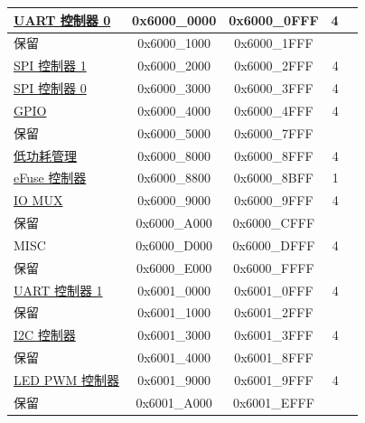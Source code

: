 \begin{longtable}[c]{ |p{5cm}|c|c|r|p{1.0cm}| }
		                \hyperref[mod:uart]{UART 控制器 0}           & 0x6000\_0000 & 0x6000\_0FFF &   4    &   \\\hline
    \rowcolor{gray!25}  保留                    & 0x6000\_1000 & 0x6000\_1FFF &        &   \\\hline
                        \hyperref[mod:spi]{SPI 控制器 1}            & 0x6000\_2000 & 0x6000\_2FFF &   4    &   \\\hline
                        \hyperref[mod:spi]{SPI 控制器 0}            & 0x6000\_3000 & 0x6000\_3FFF &   4    &   \\\hline
                        \hyperref[mod:iomuxgpio]{GPIO}                    & 0x6000\_4000 & 0x6000\_4FFF &   4    &   \\\hline
    \rowcolor{gray!25}  保留                    & 0x6000\_5000 & 0x6000\_7FFF &        &   \\\hline
                        \hyperref[mod:lowpowm]{低功耗管理}              & 0x6000\_8000 & 0x6000\_8FFF &   4    &   \\\hline
                        \hyperref[mod:efuse]{eFuse 控制器}            & 0x6000\_8800 & 0x6000\_8BFF &   1    &   \\\hline
                        \hyperref[mod:iomuxgpio]{IO MUX}                  & 0x6000\_9000 & 0x6000\_9FFF &   4    &   \\\hline
    \rowcolor{gray!25}  保留                    & 0x6000\_A000 & 0x6000\_CFFF &        &   \\\hline
                        MISC                    & 0x6000\_D000 & 0x6000\_DFFF &   4    &   \\\hline
    \rowcolor{gray!25}  保留                    & 0x6000\_E000 & 0x6000\_FFFF &        &   \\\hline
                        \hyperref[mod:uart]{UART 控制器 1}           & 0x6001\_0000 & 0x6001\_0FFF &   4    &   \\\hline
    \rowcolor{gray!25}  保留                    & 0x6001\_1000 & 0x6001\_2FFF &        &   \\\hline
                        \hyperref[mod:i2c]{I2C 控制器}              & 0x6001\_3000 & 0x6001\_3FFF &   4    &   \\\hline
    \rowcolor{gray!25}  保留                    & 0x6001\_4000 & 0x6001\_8FFF &        &   \\\hline
                        \hyperref[mod:ledpwm]{LED PWM 控制器}          & 0x6001\_9000 & 0x6001\_9FFF &   4    &   \\\hline
    \rowcolor{gray!25}  保留                    & 0x6001\_A000 & 0x6001\_EFFF &        &   \\\hline

\end{longtable}

